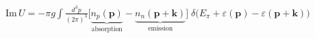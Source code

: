 \documentclass[border=2pt]{standalone}
\begin{document}
$\displaystyle \mathrm{Im}\,U=-\pi g\int\!\frac{d^3p}{(2\pi)^3}\Big[\underbrace{n_p(\mathbf p)}_{\text{absorption}}-\underbrace{n_n(\mathbf p+\mathbf k)}_{\text{emission}}\Big]\;\delta\big(E_\pi+\varepsilon(\mathbf p)-\varepsilon(\mathbf p+\mathbf k)\big)$
\end{document}
